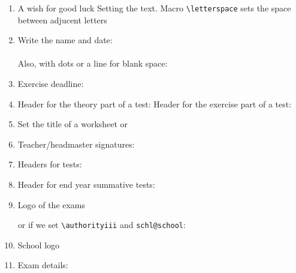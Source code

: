 \documentclass[12pt,a4page]{article}
\begin{document}
\begin{enumerate}
\item A wish for good luck
  \wish
  Setting the text. Macro \verb/\letterspace/ sets the space between adjucent letters
  \makeatletter
  \def\schl@wish{\letterspace{10} ΚΑΛΗ ΤΥΧΗ}
  \makeatother
  \wish
\item Write the name and date:\hspace{2em} \fullname{}\\
  \datefield{} \\
  Also, with dots or a line for blank space: \hspace{3em} \\ \datefield{\blankspace{10em}}
\item Exercise deadline: \hspace{3em} \\
\item Header for the theory part of a test: \theorypart
  Header for the exercise part of a test: \exercisepart
\item Set the title of a worksheet
  \worksheethd{}
  or
\item Teacher/headmaster signatures:\\
  \hfill
\item Headers for tests:
  \examhd{}
\item Header for end year summative tests:
\item Logo of the  exams

  \authoritylogo

  or if we set \verb+\authorityiii+ and \verb+schl@school+:

  \authoritylogo
\item School logo

  \subject{Μαθηματικά}
  \schoollogo{200pt}
\item Exam details:


\end{enumerate}
\end{document}

